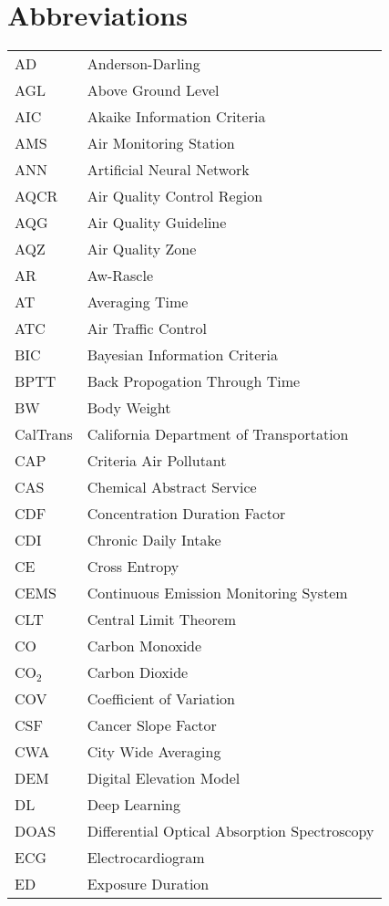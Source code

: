 \chapter*{Abbreviations}

\ssp
\small

\begin{longtable}{ll}
AD & Anderson-Darling \\
AGL & Above Ground Level \\
AIC & Akaike Information Criteria \\
AMS & Air Monitoring Station \\
ANN & Artificial Neural Network \\
AQCR & Air Quality Control Region \\
AQG & Air Quality Guideline \\
AQZ & Air Quality Zone \\
AR & Aw-Rascle \\
AT & Averaging Time \\
ATC & Air Traffic Control \\
BIC & Bayesian Information Criteria \\
BPTT & Back Propogation Through Time \\
BW & Body Weight \\
CalTrans & California Department of Transportation \\
CAP & Criteria Air Pollutant \\
CAS & Chemical Abstract Service \\
CDF & Concentration Duration Factor \\
CDI & Chronic Daily Intake \\
CE & Cross Entropy \\
CEMS & Continuous Emission Monitoring System \\
CLT & Central Limit Theorem \\
CO & Carbon Monoxide \\
CO$_{2}$ & Carbon Dioxide \\
COV & Coefficient of Variation \\
CSF & Cancer Slope Factor \\
CWA & City Wide Averaging \\
DEM & Digital Elevation Model \\
DL & Deep Learning \\
DOAS & Differential Optical Absorption Spectroscopy \\
ECG & Electrocardiogram \\
ED & Exposure Duration \\

\end{longtable}
